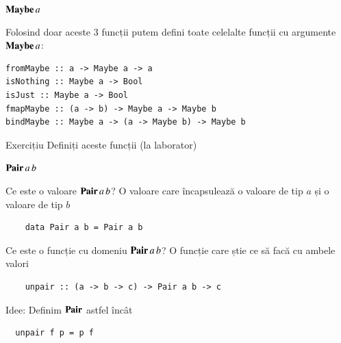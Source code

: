 \documentclass[xcolor=pdftex,romanian,colorlinks]{beamer}
\begin{document}
\begin{frame}[fragile]{$\mathop{\mathbf{Maybe}}{a}$}

\begin{center}
  \hfill
  \hfill
\end{center}

Folosind doar aceste 3 funcții putem defini toate celelalte funcții cu argumente $\mathop{\mathbf{Maybe}}{a}$:

\begin{lstlisting}
fromMaybe :: a -> Maybe a -> a
isNothing :: Maybe a -> Bool
isJust :: Maybe a -> Bool
fmapMaybe :: (a -> b) -> Maybe a -> Maybe b
bindMaybe :: Maybe a -> (a -> Maybe b) -> Maybe b
\end{lstlisting}

\begin{alertblock}{Exercițiu}
Definiți aceste funcții (la laborator)
\end{alertblock}
\end{frame}

\begin{frame}[fragile]{$\mathop{\mathop{\mathbf{Pair}}{a}}{b}$}

\begin{block}{Ce este o valoare $\mathop{\mathop{\mathbf{Pair}}{a}}{b}$?}
		O valoare care încapsulează o valoare de tip $a$ și o valoare de tip $b$
	\begin{lstlisting}
	data Pair a b = Pair a b
	\end{lstlisting}
\end{block}

\begin{block}{Ce este o funcție cu domeniu $\mathop{\mathop{\mathbf{Pair}}{a}}{b}$?}
		O funcție care știe ce să facă cu ambele valori
	\begin{lstlisting}
	unpair :: (a -> b -> c) -> Pair a b -> c
	\end{lstlisting}
\end{block}

\begin{block}{Idee:
	Definim $\mathbf{Pair}$ astfel încât}
	\begin{lstlisting}
  unpair f p = p f
	\end{lstlisting}
\end{block}
\end{frame}
\end{document}
